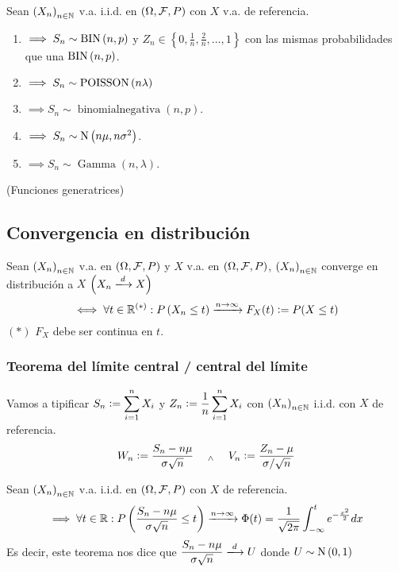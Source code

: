 Sean $\left(X_n\right)_{n\in \mathbb{N}}$ v.a. i.i.d. en $(\Omega, \mathcal{F}, P)$ con $X$ v.a. de referencia.
\begin{enumerate}
	\item {} $\implies S_n \sim \operatorname{BIN}\left(n,p\right)$ y $Z_n \in \left\{0, \frac{1}{n}, \frac{2}{n}, \dots, 1\right\}$ con las mismas probabilidades que una $\operatorname{BIN}\left(n,p\right)$.
	\item {} $\implies S_n \sim \operatorname{POISSON}\left(n\lambda\right)$
	\item {} $\implies S_n \sim \operatorname{binomial negativa}(n,p)$.
	\item {} $\implies S_n \sim \operatorname{N}\left(n\mu, n\sigma^2\right)$.
	\item {} $\implies S_n \sim \operatorname{Gamma}(n,\lambda)$.
\end{enumerate}

 (Funciones generatrices)


\subsection{Convergencia en distribución}

\begin{defn}
	Sean $\left(X_n\right)_{n\in \mathbb{N}}$ v.a. en $(\Omega, \mathcal{F}, P)$ y $X$ v.a. en $(\Omega, \mathcal{F}, P)$, $\left(X_n\right)_{n\in \mathbb{N}}$ {converge en distribución} a $X$ $\left(X_n \xlongrightarrow{d} X\right)$
	\[\iff \forall t \in \mathbb{R}^{(*)} : P\left(X_n \leq t\right) \xrightarrow{n\to\infty} F_X(t) \vcentcolon= P(X \leq t)\]
	\hspace*{\fill} $(*)$ $F_X$ debe ser continua en $t$.
\end{defn}

\subsubsection{Teorema del límite central / central del límite}

Vamos a tipificar $\displaystyle S_n\vcentcolon= \sum_{i=1}^{n} X_i$ y $\displaystyle Z_n \vcentcolon= \frac{1}{n}\sum_{i=1}^{n} X_i$ con $\left(X_n\right)_{n\in \mathbb{N}}$ i.i.d. con $X$ de referencia.
\[W_n \vcentcolon= \frac{S_n - n\mu}{\sigma \sqrt{n}} \quad \; _{\wedge} \; \quad V_n \vcentcolon= \frac{Z_n - \mu}{\sigma/\sqrt{n}}\]

\begin{teo}
	Sean $\left(X_n\right)_{n\in \mathbb{N}}$ v.a. i.i.d. en $(\Omega, \mathcal{F}, P)$ con $X$ de referencia.
	\[\implies \forall t \in \mathbb{R} : P\left(\frac{S_n - n\mu}{\sigma \sqrt{n}} \leq t\right) \xrightarrow{n\to\infty} \Phi(t) = \frac{1}{\sqrt{2\pi}}\int_{-\infty}^{t} e^{-\frac{x^2}{2}}dx\]
	Es decir, este teorema nos dice que $\ds \frac{S_n - n\mu}{\sigma \sqrt{n}} \xlongrightarrow{d} U$ donde $U\sim\operatorname{N}\left(0,1\right)$
\end{teo}

